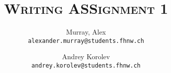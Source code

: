 \author{
    Murray, Alex\\
    \texttt{alexander.murray@students.fhnw.ch}
    \and
    Andrey Korolev\\
    \texttt{andrey.korolev@students.fhnw.ch}
}

\title{
    \vspace{20mm}
    \Huge{\textsc{Writing ASSignment 1}}
}
